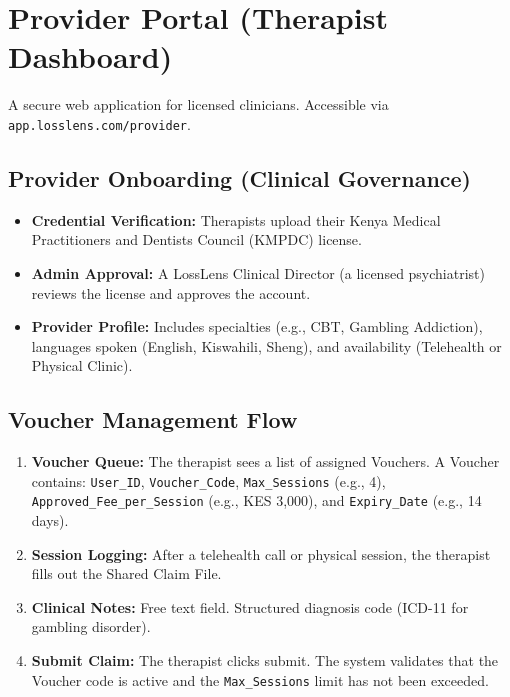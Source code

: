 \documentclass[11pt,a4paper]{article}
\begin{document}
\section{Provider Portal (Therapist Dashboard)}
A secure web application for licensed clinicians. Accessible via \texttt{app.losslens.com/provider}.

\subsection{Provider Onboarding (Clinical Governance)}
\begin{itemize}
    \item \textbf{Credential Verification:} Therapists upload their Kenya Medical Practitioners and Dentists Council (KMPDC) license.
    \item \textbf{Admin Approval:} A LossLens Clinical Director (a licensed psychiatrist) reviews the license and approves the account.
    \item \textbf{Provider Profile:} Includes specialties (e.g., CBT, Gambling Addiction), languages spoken (English, Kiswahili, Sheng), and availability (Telehealth or Physical Clinic).
\end{itemize}

\subsection{Voucher Management Flow}
\begin{enumerate}
    \item \textbf{Voucher Queue:} The therapist sees a list of assigned Vouchers. A Voucher contains: \texttt{User\_ID}, \texttt{Voucher\_Code}, \texttt{Max\_Sessions} (e.g., 4), \texttt{Approved\_Fee\_per\_Session} (e.g., KES 3,000), and \texttt{Expiry\_Date} (e.g., 14 days).
    \item \textbf{Session Logging:} After a telehealth call or physical session, the therapist fills out the Shared Claim File.
    \item \textbf{Clinical Notes:} Free text field. Structured diagnosis code (ICD-11 for gambling disorder).
    \item \textbf{Submit Claim:} The therapist clicks submit. The system validates that the Voucher code is active and the \texttt{Max\_Sessions} limit has not been exceeded.
\end{enumerate}
\end{document}
